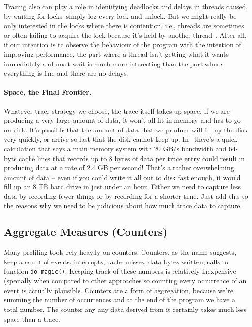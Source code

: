Tracing also can play a role in identifying deadlocks and delays in threads caused by waiting for locks: simply log every lock and unlock. But we might really be only interested in the locks where there is contention, i.e., threads are sometimes or often failing to acquire the lock because it's held by another thread~\cite{usd}. After all, if our intention is to observe the behaviour of the program with the intention of improving performance, the part where a thread isn't getting what it wants immediately and must wait is much more interesting than the part where everything is fine and there are no delays.

\paragraph{Space, the Final Frontier.} Whatever trace strategy we choose, the trace itself takes up space. If we are producing a very large amount of data, it won't all fit in memory and has to go on disk. It's possible that the amount of data that we produce will fill up the disk very quickly, or arrive so fast that the disk cannot keep up. In~\cite{usd} there's a quick calculation that says a main memory system with 20 GB/s bandwidth and 64-byte cache lines that records up to 8 bytes of data per trace entry could result in producing data at a rate of 2.4 GB per second! That's a rather overwhelming amount of data -- even if you could write it all out to disk fast enough, it would fill up an 8 TB hard drive in just under an hour. Either we need to capture less data by recording fewer things or by recording for a shorter time. Just add this to the reasons why we need to be judicious about how much trace data to capture.

\subsection*{Aggregate Measures (Counters)}
Many profiling tools rely heavily on counters. Counters, as the name suggests, keep a count of events: interrupts, cache misses, data bytes written, calls to function \texttt{do\_magic()}. Keeping track of these numbers is relatively inexpensive (specially when compared to other approaches so counting every occurrence of an event is actually plausible. Counters are a form of aggregation, because we're summing the number of occurrences and at the end of the program we have a total number. The counter any any data derived from it certainly takes much less space than a trace.

